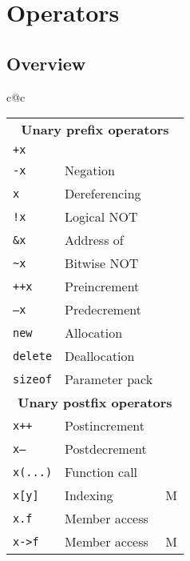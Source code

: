 \chapter{Operators}

\section{Overview}
\begingroup
\newcommand{\overloadable}[2]{{\tt #1} & #2 & \Checkmark}
\newcommand{\overloadableM}[2]{{\tt #1} & #2 & M}
\newcommand{\notoverloadable}[2]{{\tt #1} & #2 & \XSolidBrush}

\begin{center}
  \begin{tabular}{c@{\hspace{1cm}}c}
    \begin{tabular}{llc}
      \rotatebox{45}{\textbf{Operator}} & \rotatebox{45}{\textbf{Description}} & \rotatebox{90}{\textbf{Overloadable}} \\
      \toprule
      \multicolumn{3}{c}{\bf\sc Unary prefix operators} \\
      \midrule
      \overloadable{+x}{} \\
      \overloadable{-x}{Negation} \\
      \overloadable{*x}{Dereferencing} \\
      \overloadable{!x}{Logical NOT} \\
      \overloadable{\&x}{Address of} \\
      \overloadable{\~{}x}{Bitwise NOT} \\
      \overloadable{++x}{Preincrement} \\
      \overloadable{--x}{Predecrement} \\
      \overloadable{new}{Allocation} \\
      \overloadable{delete}{Deallocation} \\
      \overloadable{sizeof}{Parameter pack} \\
      \midrule
      \multicolumn{3}{c}{\bf\sc Unary postfix operators} \\
      \midrule
      \overloadable{x++}{Postincrement} \\
      \overloadable{x--}{Postdecrement} \\
      \overloadable{x(...)}{Function call} \\
      \overloadableM{x[y]}{Indexing} \\
      \notoverloadable{x.f}{Member access} \\
      \overloadableM{x->f}{Member access} \\

\end{tabular}
\end{tabular}
\end{center}
